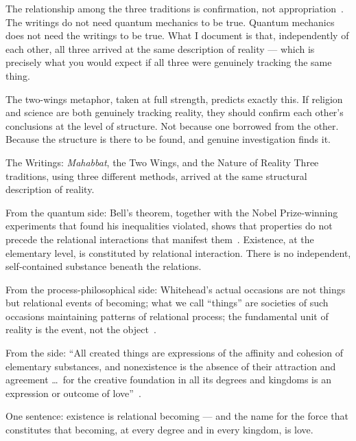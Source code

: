 The relationship among the three traditions is confirmation, not
appropriation~\citeyearpar{AdamsMahabbat}.
The \bahai writings do not need quantum mechanics to be true.
Quantum mechanics does not need the \bahai writings to be true.
What I document is that, independently of each other, all three arrived at
the same description of reality --- which is precisely what you would expect
if all three were genuinely tracking the same thing.

The two-wings metaphor, taken at full strength, predicts exactly this.
If religion and science are both genuinely tracking reality, they should
confirm each other's conclusions at the level of structure.
Not because one borrowed from the other.
Because the structure is there to be found, and genuine investigation
finds it.

\begin{convergencemoment}{The Writings: \textit{Mahabbat}, the Two Wings, and the Nature of Reality}
Three traditions, using three different methods, arrived at the same
structural description of reality.

From the quantum side: Bell's theorem, together with the Nobel Prize-winning
experiments that found his inequalities violated, shows that properties do not
precede the relational interactions that manifest them~\citeyearpar{Bell1964,Aspect1982}.
Existence, at the elementary level, is constituted by relational interaction.
There is no independent, self-contained substance beneath the relations.

From the process-philosophical side: Whitehead's actual occasions are not
things but relational events of becoming; what we call ``things'' are societies
of such occasions maintaining patterns of relational process;
the fundamental unit of reality is the event, not the object~\citeyearpar{Whitehead1929}.

From the \bahai side: ``All created things are expressions of the affinity
and cohesion of elementary substances, and nonexistence is the absence of
their attraction and agreement \ldots\ for the creative foundation in all its
degrees and kingdoms is an expression or outcome of love''~\citep[Talk~48]{PUP}.

One sentence: existence is relational becoming --- and the name for the force
that constitutes that becoming, at every degree and in every kingdom, is love.
\end{convergencemoment}
